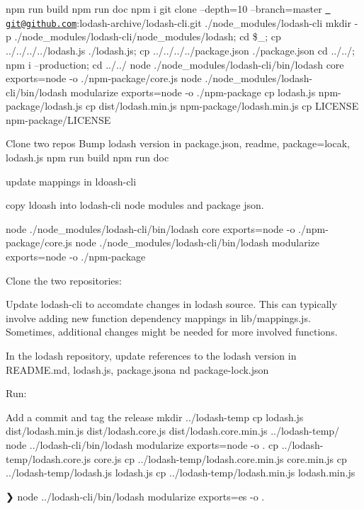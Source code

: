 npm run build npm run doc npm i git clone --depth=10 --branch=master \href{mailto:git@github.com}{\texttt{ git@github.\+com}}\+:lodash-\/archive/lodash-\/cli.\+git ./node\+\_\+modules/lodash-\/cli mkdir -\/p ./node\+\_\+modules/lodash-\/cli/node\+\_\+modules/lodash; cd \$\+\_\+; cp ../../../../lodash.js ./lodash.js; cp ../../../../package.json ./package.json cd ../../; npm i --production; cd ../../ node ./node\+\_\+modules/lodash-\/cli/bin/lodash core exports=node -\/o ./npm-\/package/core.js node ./node\+\_\+modules/lodash-\/cli/bin/lodash modularize exports=node -\/o ./npm-\/package cp lodash.\+js npm-\/package/lodash.\+js cp dist/lodash.\+min.\+js npm-\/package/lodash.\+min.\+js cp LICENSE npm-\/package/\+LICENSE


\begin{DoxyEnumerate}
\item Clone two repos Bump lodash version in package.\+json, readme, package=locak, lodash.\+js npm run build npm run doc
\item update mappings in ldoash-\/cli
\item copy ldoash into lodash-\/cli node modules and package json.
\end{DoxyEnumerate}

node ./node\+\_\+modules/lodash-\/cli/bin/lodash core exports=node -\/o ./npm-\/package/core.js node ./node\+\_\+modules/lodash-\/cli/bin/lodash modularize exports=node -\/o ./npm-\/package


\begin{DoxyEnumerate}
\item Clone the two repositories\+: 
\begin{DoxyCode}{0}

\end{DoxyCode}

\item Update lodash-\/cli to accomdate changes in lodash source. This can typically involve adding new function dependency mappings in lib/mappings.\+js. Sometimes, additional changes might be needed for more involved functions.
\item In the lodash repository, update references to the lodash version in README.\+md, lodash.\+js, package.\+jsona nd package-\/lock.\+json
\item Run\+: 
\begin{DoxyCode}{0}

\end{DoxyCode}

\item Add a commit and tag the release mkdir ../lodash-\/temp cp lodash.\+js dist/lodash.\+min.\+js dist/lodash.\+core.\+js dist/lodash.\+core.\+min.\+js ../lodash-\/temp/ node ../lodash-\/cli/bin/lodash modularize exports=node -\/o . cp ../lodash-\/temp/lodash.core.\+js core.\+js cp ../lodash-\/temp/lodash.core.\+min.\+js core.\+min.\+js cp ../lodash-\/temp/lodash.js lodash.\+js cp ../lodash-\/temp/lodash.min.\+js lodash.\+min.\+js
\end{DoxyEnumerate}

❯ node ../lodash-\/cli/bin/lodash modularize exports=es -\/o . 